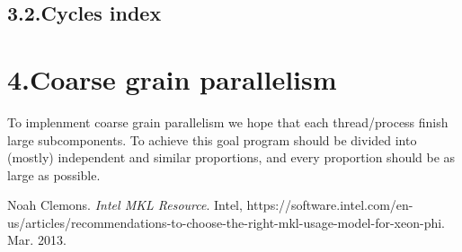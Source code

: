 \documentclass{article}
\begin{document}
\subsection{3.2.\hspace*{0.5em}Cycles index}\label{sec-cycles-index}%

\section{4.\hspace*{0.5em}Coarse grain parallelism}\label{sec-coarse-grain-parallelism}%

\noindent{}To implenment coarse grain parallelism we hope that each thread/process finish large subcomponents. To achieve this goal  program should be divided into (mostly) independent and similar proportions, and every proportion should be as large as possible.%

{%
\begin{thebibliography}{1}%
\label{sec-bibliography}%

Noah Clemons. \emph{Intel MKL Resource}. Intel, https://software.intel.com/en-us/articles/recommendations-to-choose-the-right-mkl-usage-model-for-xeon-phi. Mar. 2013.\label{mkl-mic}%
\par%
\end{thebibliography}}%
\end{document}
